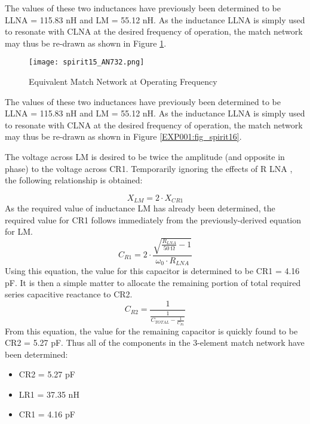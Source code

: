         The values of these two inductances have previously been determined to be LLNA = 115.83 nH and LM = 
        55.12 nH. As the inductance LLNA is simply used to resonate with CLNA at the desired frequency of 
        operation, the match network may thus be re-drawn as shown in Figure \ref{EXP001:fig_spirit15}.

        \begin{figure}[ht!] %
          \centering
          \texttt{[image: spirit15\_AN732.png]}
          \caption{Equivalent Match Network at Operating Frequency}
          \label{EXP001:fig_spirit15}
        \end{figure}
        
        The values of these two inductances have previously been determined to be LLNA = 115.83 nH and LM = 
        55.12 nH. As the inductance LLNA is simply used to resonate with CLNA at the desired frequency of 
        operation, the match network may thus be re-drawn as shown in Figure \ref{EXP001:fig_spirit16}.

        The voltage across LM is desired to be twice the amplitude (and opposite in phase) to the voltage 
        across CR1. Temporarily ignoring the effects of R LNA , the following relationship is obtained:
        
        \begin{equation}\label{EXP001:eq_spirit16}
         X_{LM} = 2\cdot X_{CR1}
        \end{equation}
        As the required value of inductance LM has already been determined, the required value for CR1 
        follows immediately from the previously-derived equation for LM.
        \begin{equation}\label{EXP001:eq_spirit17}
          C_{R1} = 2\cdot\frac{\sqrt{\frac{R_{LNA}}{\SI{50}{\ohm}}-1}}{\omega_0\cdot R_{LNA}}
        \end{equation}
        Using this equation, the value for this capacitor is determined to be CR1 = 4.16 pF. It is then a 
        simple matter to allocate the remaining portion of total required series capacitive reactance to CR2.
        \begin{equation}\label{EXP001:eq_spirit18}
          C_{R2} = \frac{1}{\frac{1}{C_{TOTAL}-\frac{1}{C_{R1}}}}
        \end{equation}
        From this equation, the value for the remaining capacitor is quickly found to be CR2 = 5.27 pF. Thus 
        all of the components in the 3-element match network have been determined:
        \begin{itemize}
          \item CR2 = 5.27 pF
          \item LR1 = 37.35 nH
          \item CR1 = 4.16 pF
        \end{itemize}
        
